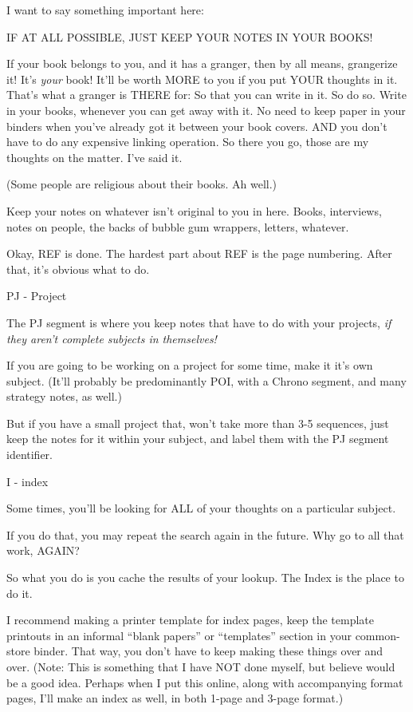 \documentclass[oneside]{book}
\begin{document}
  I want to say something important here:

  IF AT ALL POSSIBLE, JUST KEEP YOUR NOTES IN YOUR BOOKS!

  If your book belongs to you, and it has a granger, then by all
means, grangerize it! It's \emph{your} book! It'll be worth MORE to you if
you put YOUR thoughts in it. That's what a granger is THERE for: So
that you can write in it. So do so. Write in your books, whenever you
can get away with it. No need to keep paper in your binders when
you've already got it between your book covers. AND you don't have to
do any expensive linking operation. So there you go, those are my
thoughts on the matter. I've said it.

  (Some people are religious about their books. Ah well.)

  Keep your notes on whatever isn't original to you in here. Books,
interviews, notes on people, the backs of bubble gum wrappers,
letters, whatever.

  Okay, REF is done. The hardest part about REF is the page
numbering. After that, it's obvious what to do.


PJ - Project

  The PJ segment is where you keep notes that have to do with your
projects, \emph{if they aren't complete subjects in themselves!}

  If you are going to be working on a project for some time, make it
it's own subject. (It'll probably be predominantly POI, with a Chrono
segment, and many strategy notes, as well.)

  But if you have a small project that, won't take more than 3-5
sequences, just keep the notes for it within your subject, and label
them with the PJ segment identifier.


I - index

  Some times, you'll be looking for ALL of your thoughts on a
particular subject.

  If you do that, you may repeat the search again in the future. Why
go to all that work, AGAIN?

  So what you do is you cache the results of your lookup. The Index is
the place to do it.

  I recommend making a printer template for index pages, keep the
template printouts in an informal ``blank papers'' or ``templates''
section in your common-store binder. That way, you don't have to keep
making these things over and over. (Note: This is something that I
have NOT done myself, but believe would be a good idea. Perhaps when I
put this online, along with accompanying format pages, I'll make an
index as well, in both 1-page and 3-page format.)
\end{document}
